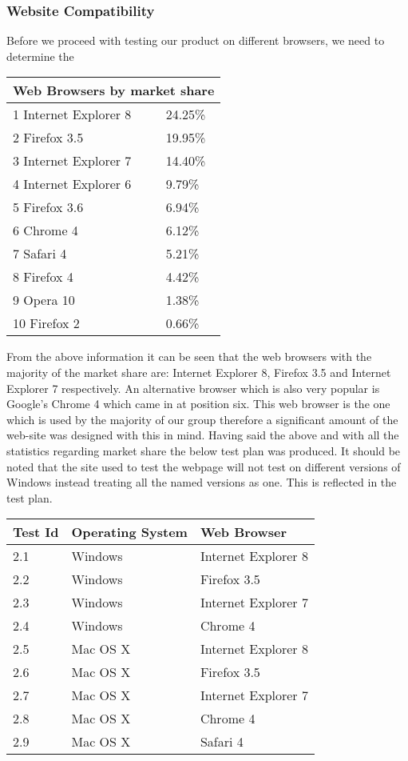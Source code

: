\subsubsection{Website Compatibility}

Before we proceed with testing our product on different browsers, we need to determine the 

\begin{tabular}{|l|l|}
\hline
\multicolumn{2}{|c|}{Web Browsers by market share} \\
\hline
1 Internet Explorer 8 & 24.25\% \\
2 Firefox 3.5 & 19.95\% \\
3 Internet Explorer 7 & 14.40\% \\
4 Internet Explorer 6 & 9.79\% \\
5 Firefox 3.6 & 6.94\% \\
6 Chrome 4 & 6.12\% \\
7 Safari 4 & 5.21\% \\
8 Firefox 4 & 4.42\% \\
9 Opera 10 & 1.38\% \\
10 Firefox 2 & 0.66\% \\
\hline
\end{tabular}
\newline{}
\newline{}
From the above information it can be seen that the web browsers with the majority of the 
market share are: Internet Explorer 8, Firefox 3.5 and Internet Explorer 7 respectively. 
An alternative browser which is also very popular is Google’s Chrome 4 which came in at 
position six. This web browser is the one which is used by the majority of our group 
therefore a significant amount of the web-site was designed with this in mind. Having said 
the above and with all the statistics regarding market share the below test plan was 
produced. It should be noted that the site used to test the webpage will not test on 
different versions of Windows instead treating all the named versions as one. This is 
reflected in the test plan.
\newline{}
\newline{}
\begin{tabular}{|l|l|l|}
\hline
Test Id & Operating System & Web Browser \\
\hline
2.1 & Windows & Internet Explorer 8 \\
2.2 & Windows & Firefox 3.5 \\
2.3 & Windows & Internet Explorer 7 \\
2.4 & Windows & Chrome 4 \\
2.5 & Mac OS X & Internet Explorer 8 \\
2.6 & Mac OS X & Firefox 3.5 \\
2.7 & Mac OS X & Internet Explorer 7 \\
2.8 & Mac OS X & Chrome 4 \\
2.9 & Mac OS X & Safari 4 \\
\hline
\end{tabular}
